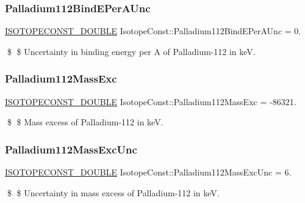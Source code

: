\subsubsection{\texorpdfstring{Palladium112\+Bind\+E\+Per\+A\+Unc}{Palladium112BindEPerAUnc}}
{\footnotesize\ttfamily \mbox{\hyperlink{group___isotope_const-_macros_ga8f45a7272ce02c0b4c65c44636ed719a}{I\+S\+O\+T\+O\+P\+E\+C\+O\+N\+S\+T\+\_\+\+D\+O\+U\+B\+LE}} Isotope\+Const\+::\+Palladium112\+Bind\+E\+Per\+A\+Unc = 0.}

\$ \$ Uncertainty in binding energy per A of Palladium-\/112 in keV. \mbox{\label{group___isotope_const-_palladium-_pd112_ga6f5bd6ce6b84f3744e196393f8275a10}} 
\subsubsection{\texorpdfstring{Palladium112\+Mass\+Exc}{Palladium112MassExc}}
{\footnotesize\ttfamily \mbox{\hyperlink{group___isotope_const-_macros_ga8f45a7272ce02c0b4c65c44636ed719a}{I\+S\+O\+T\+O\+P\+E\+C\+O\+N\+S\+T\+\_\+\+D\+O\+U\+B\+LE}} Isotope\+Const\+::\+Palladium112\+Mass\+Exc = -\/86321.}

\$ \$ Mass excess of Palladium-\/112 in keV. \mbox{\label{group___isotope_const-_palladium-_pd112_ga25752964947197ca1964166c0bcf6f24}} 
\subsubsection{\texorpdfstring{Palladium112\+Mass\+Exc\+Unc}{Palladium112MassExcUnc}}
{\footnotesize\ttfamily \mbox{\hyperlink{group___isotope_const-_macros_ga8f45a7272ce02c0b4c65c44636ed719a}{I\+S\+O\+T\+O\+P\+E\+C\+O\+N\+S\+T\+\_\+\+D\+O\+U\+B\+LE}} Isotope\+Const\+::\+Palladium112\+Mass\+Exc\+Unc = 6.}

\$ \$ Uncertainty in mass excess of Palladium-\/112 in keV. \mbox{\label{group___isotope_const-_palladium-_pd112_gad220aa37b7a2f3f880bc4a63000b0dcc}} 
